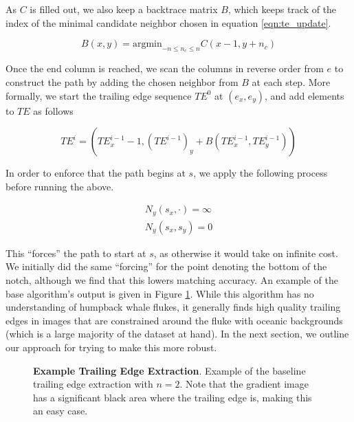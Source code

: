 As $C$ is filled out, we also keep a backtrace matrix $B$, which keeps track of the index of the minimal candidate neighbor chosen in equation \eqref{eqn:te_update}.

\begin{equation} \label{eqn:backtrace_update}
	B(x,y) = \text{argmin}_{-n \leq n_c \leq n} C(x-1, y+n_c)
\end{equation}

Once the end column is reached, we scan the columns in reverse order from $e$ to construct the path by adding the chosen neighbor from $B$ at each step.
More formally, we start the trailing edge sequence $TE^0$ at $(e_x, e_y)$, and add elements to $TE$ as follows

\begin{equation} \label{eqn:te_build}
	TE^i = (TE^{i-1}_x - 1, (TE^{i-1})_y + B(TE^{i-1}_x,TE^{i-1}_y))
\end{equation}

In order to enforce that the path begins at $s$, we apply the following process before running the above.

\begin{align} \label{eqn:te_setup}
N_y(s_x,\cdot) = \infty \\
N_y(s_x,s_y) = 0
\end{align}

This ``forces'' the path to start at $s$, as otherwise it would take on infinite cost.
We initially did the same ``forcing'' for the point denoting the bottom of the notch, although we find that this lowers matching accuracy.
An example of the base algorithm's output is given in Figure \ref{fig:example_te_extract_noscorer}.
While this algorithm has no understanding of humpback whale flukes, it generally finds high quality trailing edges in images that are constrained around the fluke with oceanic backgrounds (which is a large majority of the dataset at hand).
In the next section, we outline our approach for trying to make this more robust.

\begin{figure}[t]%
\centering
{}
{}
\caption{\textbf{Example Trailing Edge Extraction}. Example of the baseline trailing edge extraction with $n = 2$. Note that the gradient image has a significant black area where the trailing edge is, making this an easy case.}
\label{fig:example_te_extract_noscorer}
\end{figure}




